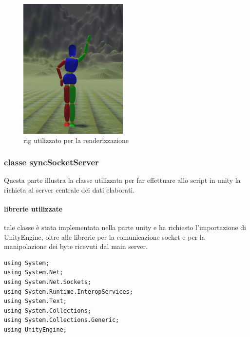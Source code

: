 \documentclass[10pt,a4paper]{article}
\begin{document}
\begin{figure}[h!]
  	\centering
    \includegraphics[height=200pt]{dummy.png}
    \caption{rig utilizzato per la renderizzazione}
\end{figure}

\subsubsection{classe syncSocketServer}
Questa parte illustra la classe utilizzata per far effettuare allo script in unity la richieta al server centrale dei dati elaborati.

\paragraph{librerie utilizzate}
tale classe è stata implementata nella parte unity e ha richiesto l'importazione di UnityEngine, oltre alle librerie per la comunicazione socket e per la manipolazione dei byte ricevuti dal main server. 
\begin{lstlisting}[style=mycsharp, caption=librerie class client C\#, captionpos=b]
using System;
using System.Net;
using System.Net.Sockets;
using System.Runtime.InteropServices;
using System.Text;
using System.Collections;
using System.Collections.Generic;
using UnityEngine;

\end{lstlisting}
\end{document}
